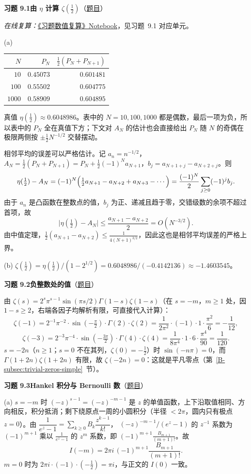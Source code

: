 \documentclass[11pt,a4paper]{article}
\newcommand{\bref}[1]{\ref*{B-#1}}
\newcommand{\Sol}[2]{%
  \par\addvspace{1.2em}\noindent
  \hypertarget{s:#1}{}\textbf{习题 #1\quad #2}\hfill{\small（\hyperlink{q:#1}{题目}）}\par
  \nopagebreak\smallskip}
\begin{document}
\Sol{9.1}{由 $\eta$ 计算 $\zeta(\tfrac12)$}
\emph{在线复算：}\href{https://colab.research.google.com/github/lichengtong123/lichengtong-RH/blob/main/\%E4\%B9\%A0\%E9\%A2\%98\%E4\%B8\%8E\%E8\%A7\%A3\%E7\%AD\%94/\%E4\%B9\%A0\%E9\%A2\%98\%E6\%95\%B0\%E5\%80\%BC\%E5\%A4\%8D\%E7\%AE\%97.ipynb}{《习题数值复算》Notebook}，见习题~9.1 对应单元。

(a)
\begin{center}
\begin{tabular}{rrr}
\toprule
$N$ & $P_N$ & $\tfrac12(P_N+P_{N+1})$\\
\midrule
$10$ & $0.45073$ & $0.601481$\\
$100$ & $0.55502$ & $0.604775$\\
$1000$ & $0.58909$ & $0.604895$\\
\bottomrule
\end{tabular}
\end{center}
真值 $\eta(\tfrac12)\approx0.6048986$。表中的 $N=10,100,1000$ 都是偶数，最后一项为负，所以表中的 $P_N$ 全在真值下方；下文对 $A_N$ 的估计也会直接给出 $P_N$ 随 $N$ 的奇偶在极限两侧按 $\pm\tfrac12 N^{-1/2}$ 交替摆动。

相邻平均的误差可以严格估计。记 $a_n=n^{-1/2}$，$A_N=\frac12(P_N+P_{N+1})=P_N+\frac12(-1)^Na_{N+1}$，$b_j=a_{N+1+j}-a_{N+2+j}$。则
\[
  \eta(\tfrac12)-A_N=(-1)^N\Bigl(\tfrac12a_{N+1}-a_{N+2}+a_{N+3}-\cdots\Bigr)
  =\frac{(-1)^N}2\sum_{j\ge0}(-1)^jb_j .
\]
由于 $a_n$ 是凸函数在整数点的值，$b_j$ 为正、递减且趋于零，交错级数的余项不超过首项，故
\[
  \bigl|\eta(\tfrac12)-A_N\bigr|\le\frac{a_{N+1}-a_{N+2}}2=O(N^{-3/2}).
\]
由中值定理，$\frac12(a_{N+1}-a_{N+2})\le\frac1{4(N+1)^{3/2}}$，因此这也是相邻平均误差的严格上界。

(b) $\zeta(\tfrac12)=\eta(\tfrac12)/(1-2^{1/2})=0.6048986/(-0.4142136)\approx-1.4603545$。

\Sol{9.2}{负整数处的值}
由 $\zeta(s)=2^s\pi^{s-1}\sin(\pi s/2)\Gamma(1-s)\zeta(1-s)$（在 $s=-m$，$m\ge1$ 处，因 $1-s\ge2$，右端各因子均解析有限，可直接代入计算）：
\[
  \zeta(-1)=2^{-1}\pi^{-2}\cdot\sin(-\tfrac\pi2)\cdot\Gamma(2)\cdot\zeta(2)=\frac1{2\pi^2}\cdot(-1)\cdot1\cdot\frac{\pi^2}6=-\frac1{12},
\]
\[
  \zeta(-3)=2^{-3}\pi^{-4}\cdot\sin(-\tfrac{3\pi}2)\cdot\Gamma(4)\cdot\zeta(4)=\frac1{8\pi^4}\cdot1\cdot6\cdot\frac{\pi^4}{90}=\frac1{120}.
\]
$s=-2n$（$n\ge1$；$s=0$ 不在其列，$\zeta(0)=-\frac12$）时 $\sin(-n\pi)=0$，而 $\Gamma(1+2n)\zeta(1+2n)$ 有限，故 $\zeta(-2n)=0$：这就是平凡零点（第~\bref{subsec:trivial-zeros-simple}~节）。

\Sol{9.3}{Hankel 积分与 Bernoulli 数}
(a) $s=-m$ 时 $(-z)^{s-1}=(-z)^{-m-1}$ 是 $z$ 的单值函数，上下沿取值相同、方向相反，积分抵消；剩下绕原点一周的小圆积分（半径 $<2\pi$，圆内只有极点 $z=0$）。由
$\dfrac1{e^z-1}=\sum_{k\ge0}B_k\dfrac{z^{k-1}}{k!}$，
$(-z)^{-m-1}/(e^z-1)$ 的 $z^{-1}$ 系数为 $(-1)^{m+1}$ 乘以 $\frac1{e^z-1}$ 的 $z^m$ 系数，即 $(-1)^{m+1}\frac{B_{m+1}}{(m+1)!}$。故
\[
  I(-m)=2\pi i\,(-1)^{m+1}\frac{B_{m+1}}{(m+1)!}.
\]
$m=0$ 时为 $2\pi i\cdot(-1)\cdot(-\tfrac12)=\pi i$，与正文的 $I(0)$ 一致。
\end{document}
